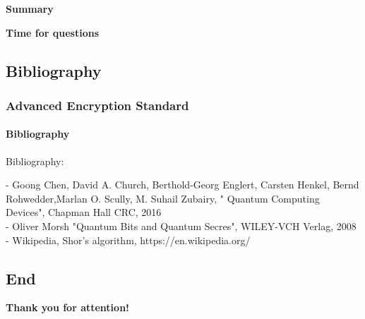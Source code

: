 \begin{frame}
	
	\begin{center}
		\Huge \textbf{Summary}
	\end{center}

\end{frame}

\begin{frame}
	
	\begin{center}
		\Huge \textbf{Time for questions}
	\end{center}

\end{frame}
\subsection{Bibliography}
\begin{frame}
	\frametitle{Advanced Encryption Standard}
		\framesubtitle{Bibliography}
	{\normalsize 
	
	Bibliography:\\	
	\vspace{0,2cm}

{-  Goong Chen, David A. Church, Berthold-Georg Englert, Carsten Henkel, Bernd Rohwedder,Marlan O. Scully, M. Suhail Zubairy, " Quantum Computing Devices", Chapman Hall CRC, 2016}\\
\vspace{0,2cm}
{- Oliver Morsh "Quantum Bits and Quantum Secres", WILEY-VCH Verlag, 2008}\\
\vspace{0,2cm}
{- Wikipedia, Shor's algorithm, https://en.wikipedia.org/}\\

	}
\end{frame}

\subsection{End}
\begin{frame}
	
	\begin{center}
		\Huge \textbf{Thank you for attention!}
	\end{center}

\end{frame}
